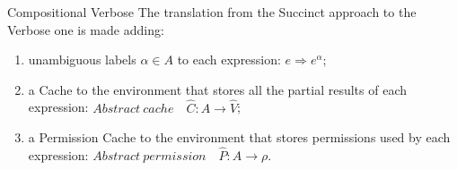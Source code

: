 \documentclass[11pt]{beamer}
\begin{document}
%
\newcommand{\genl}[1]{\mathcal{C}_{*\rho_s}\llbracket (#1)^\all \rrbracket}
\newcommand{\gen}[1]{\mathcal{C}_{*\rho_s}\llbracket (#1) \rrbracket}
\newcommand{\Cel}{\mathsf{C}}
\newcommand{\Rel}{\mathsf{\Gamma}}
\newcommand{\Pel}{\mathsf{P}}
\newcommand{\Mel}{\mathsf{M}}
\newcommand{\El}{\mathsf{E}}
\newcommand{\Upsel}{\mathsf{\Upsilon}}
\newcommand{\Phiel}{\mathsf{\Phi}}
\newcommand{\braces}[1]{\{ #1 \} }
\newcommand{\parens}[1]{\( #1 \) }

\begin{frame}{Compositional Verbose}
The translation from the Succinct approach to the Verbose one is made adding:
\begin{enumerate}
\item unambiguous labels $\alpha \in A$ to each expression: $e \Rightarrow e^\alpha$;
\item a Cache to the environment that stores all the partial results of each expression: $\mathit{Abstract\ cache} \quad \hat{C} : A \rightarrow \hat{V}$;
\item a Permission Cache to the environment that stores permissions used by each expression: $\mathit{Abstract\ permission} \quad \hat{P} : A \rightarrow \rho$.
\end{enumerate}
\end{frame}
\end{document}
